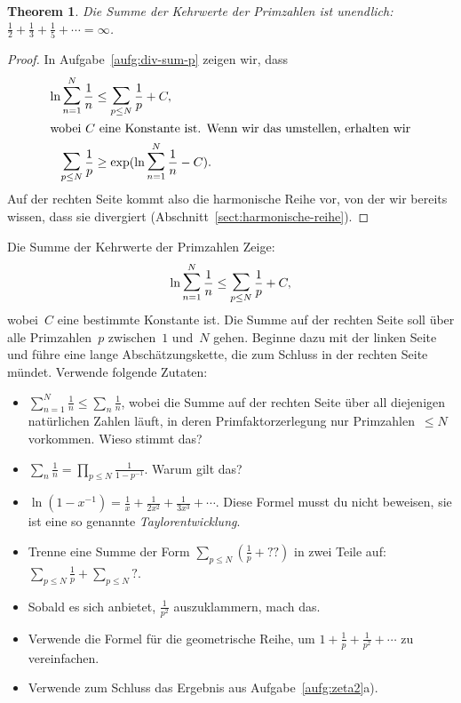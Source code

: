\documentclass[twoside]{../zirkelblatt1415}
\theoremstyle{definition}
\theoremstyle{plain}
\newtheorem{thm}[defn]{Theorem}
\theoremstyle{remark}
\newcommand{\bigsum}{\mathop{\mathlarger{\mathlarger{\sum}}}}
\begin{document}
\begin{thm}Die Summe der Kehrwerte der Primzahlen ist unendlich:
$\frac{1}{2} + \frac{1}{3} + \frac{1}{5} + \cdots = \infty$.
\end{thm}
\begin{proof}In Aufgabe~\ref{aufg:div-sum-p} zeigen wir, dass
\begin{align*}
  \ln \bigsum_{n=1}^N \frac{1}{n} &\leq \bigsum_{p \leq N} \frac{1}{p} + C, \\
\intertext{wobei~$C$ eine Konstante ist. Wenn wir das umstellen, erhalten wir}
\bigsum_{p \leq N} \frac{1}{p} &\geq \exp(\ln \bigsum_{n=1}^N \frac{1}{n} -
C).
\end{align*}
Auf der rechten Seite kommt also die harmonische Reihe vor, von der wir bereits
wissen, dass sie divergiert (Abschnitt~\ref{sect:harmonische-reihe}).
\end{proof}

\begin{aufgabe}{Die Summe der Kehrwerte der Primzahlen}\label{aufg:div-sum-p}
Zeige:
\[ \ln \bigsum_{n=1}^N \frac{1}{n} \leq \bigsum_{p \leq N} \frac{1}{p} + C, \]
wobei~$C$ eine bestimmte Konstante ist. Die Summe auf der rechten Seite soll
über alle Primzahlen~$p$ zwischen~$1$ und~$N$ gehen. Beginne dazu mit der
linken Seite und führe eine lange Abschätzungskette, die zum Schluss in der
rechten Seite mündet. Verwende folgende Zutaten:
\begin{itemize}
\item $\sum_{n=1}^N \frac{1}{n} \leq \sum_n \frac{1}{n}$, wobei die Summe auf
der rechten Seite über all diejenigen natürlichen Zahlen läuft, in deren
Primfaktorzerlegung nur Primzahlen~$\leq N$ vorkommen. Wieso stimmt das?
\item $\sum_n \frac{1}{n} = \prod_{p \leq N} \frac{1}{1 - p^{-1}}$. Warum gilt
das?
\item $\ln(1-x^{-1}) = \frac{1}{x} + \frac{1}{2x^2} + \frac{1}{3x^3} + \cdots$.
Diese Formel musst du nicht beweisen, sie ist eine so genannte
\emph{Taylorentwicklung}.
\item Trenne eine Summe der Form $\sum_{p \leq N} (\frac{1}{p} + {??})$ in zwei
Teile auf: $\sum_{p \leq N} \frac{1}{p} + \sum_{p \leq N} {?}$.
\item Sobald es sich anbietet, $\frac{1}{p^2}$ auszuklammern, mach das.
\item Verwende die Formel für die geometrische Reihe, um $1 + \frac{1}{p} +
\frac{1}{p^2} + \cdots$ zu vereinfachen.
\item Verwende zum Schluss das Ergebnis aus Aufgabe~\ref{aufg:zeta2}a).
\end{itemize}\fixlistspacing
\end{aufgabe}
\end{document}
